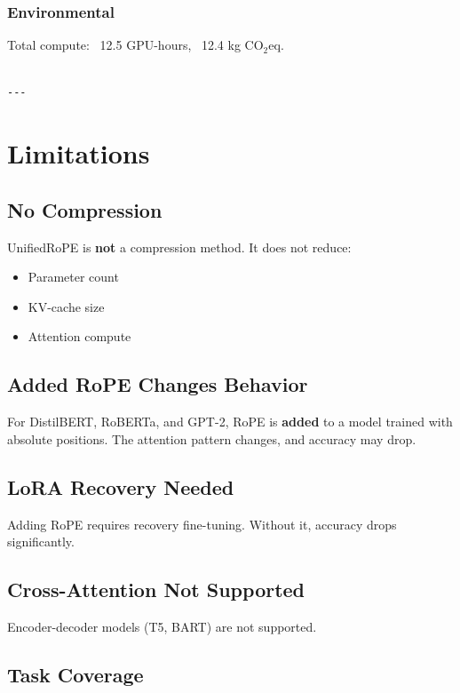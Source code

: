 {\begin{itemize}
\end{itemize}
\subsubsection{Environmental}
Total compute: ~12.5 GPU-hours, ~12.4 kg CO$_2$eq.
\begin{lstlisting}

---
\end{lstlisting}


\section{Limitations}

\subsection{No Compression}

UnifiedRoPE is \textbf{not} a compression method. It does not reduce:
\begin{itemize}
\item Parameter count
\item KV-cache size
\item Attention compute

\end{itemize}
\subsection{Added RoPE Changes Behavior}

For DistilBERT, RoBERTa, and GPT-2, RoPE is \textbf{added} to a model trained 
with absolute positions. The attention pattern changes, and accuracy may 
drop.

\subsection{LoRA Recovery Needed}

Adding RoPE requires recovery fine-tuning. Without it, accuracy drops 
significantly.

\subsection{Cross-Attention Not Supported}

Encoder-decoder models (T5, BART) are not supported.

\subsection{Task Coverage}

}
